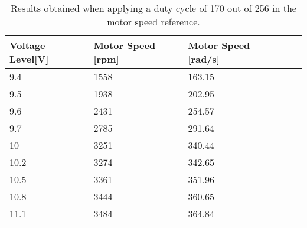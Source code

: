 \begin{table}[H]
	\centering
	\begin{tabular}{|l|l|l|l|p{4.3cm}|}
		\hline%
		\textbf{Voltage Level[V]}    & \textbf{Motor Speed [rpm]} & \textbf{Motor Speed [rad/s]} \\ 
		\hline%
		9.4                & 1558         	   &  163.15                                       \\
		\hline%
		9.5      &  1938 						       &  202.95				                \\
		\hline%
		9.6       &  2431                               &  254.57   			                  \\
		\hline%
		9.7    & 2785                               &  291.64  			                       \\
		\hline%
		10   &    3251                               &  340.44                                 \\
		\hline%
		10.2   &  3274 						       &  342.65				                   \\
		\hline%
		10.5 &  3361                               &  351.96    			                    \\
		\hline%
		10.8   &    3444                               &  360.65                               \\
		\hline%
		11.1     &  3484 						       &  364.84				                \\
		\hline%
	\end{tabular}
	\caption{Results obtained when applying a duty cycle of 170 out of 256 in the motor speed reference.}
\end{table}
